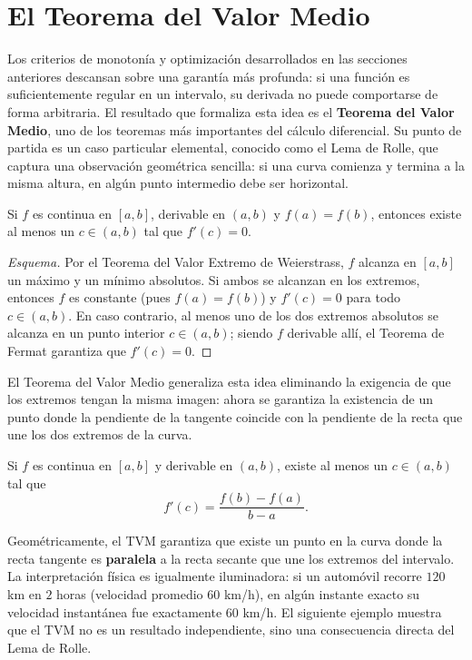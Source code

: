 \section{El Teorema del Valor Medio}

Los criterios de monotonía y optimización desarrollados en las secciones
anteriores descansan sobre una garantía más profunda: si una función es
suficientemente regular en un intervalo, su derivada no puede comportarse
de forma arbitraria. El resultado que formaliza esta idea es el
\textbf{Teorema del Valor Medio}, uno de los teoremas más importantes
del cálculo diferencial. Su punto de partida es un caso particular
elemental, conocido como el Lema de Rolle, que captura una observación
geométrica sencilla: si una curva comienza y termina a la misma altura,
en algún punto intermedio debe ser horizontal.

\begin{lemma}[Rolle]
Si $f$ es continua en $[a,b]$, derivable en $(a,b)$ y $f(a)=f(b)$,
entonces existe al menos un $c\in(a,b)$ tal que $f'(c)=0$.
\end{lemma}

\begin{proof}[Esquema]
Por el Teorema del Valor Extremo de Weierstrass, $f$ alcanza en $[a,b]$ un
máximo y un mínimo absolutos. Si ambos se alcanzan en los extremos, entonces
$f$ es constante (pues $f(a)=f(b)$) y $f'(c)=0$ para todo $c\in(a,b)$. En caso
contrario, al menos uno de los dos extremos absolutos se alcanza en un punto
interior $c\in(a,b)$; siendo $f$ derivable allí, el Teorema de Fermat garantiza
que $f'(c)=0$.
\end{proof}

El Teorema del Valor Medio generaliza esta idea eliminando la exigencia
de que los extremos tengan la misma imagen: ahora se garantiza la
existencia de un punto donde la pendiente de la tangente coincide con
la pendiente de la recta que une los dos extremos de la curva.

\begin{theorem}
Si $f$ es continua en $[a,b]$ y derivable en $(a,b)$, existe al menos
un $c\in(a,b)$ tal que
\[
f'(c) = \frac{f(b)-f(a)}{b-a}.
\]
\end{theorem}

Geométricamente, el TVM garantiza que existe un punto en la curva donde
la recta tangente es \textbf{paralela} a la recta secante que une los
extremos del intervalo. La interpretación física es igualmente
iluminadora: si un automóvil recorre $120$ km en $2$ horas (velocidad
promedio $60$ km/h), en algún instante exacto su velocidad instantánea
fue exactamente $60$ km/h. El siguiente ejemplo muestra que el TVM no
es un resultado independiente, sino una consecuencia directa del Lema
de Rolle.


